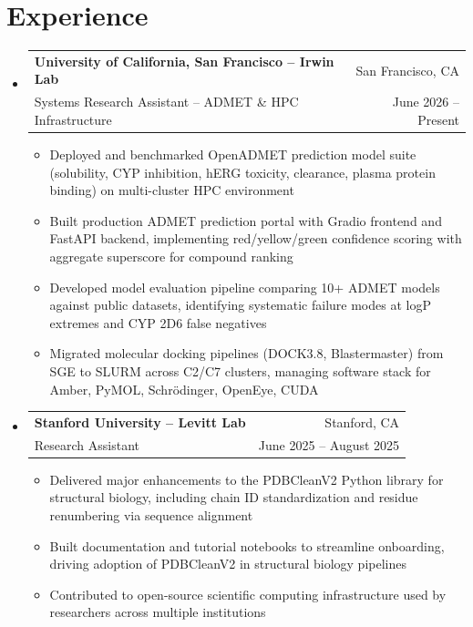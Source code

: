 \documentclass[letterpaper,11pt]{article}
\makeatletter
\newcommand{\resumeItem}[1]{
  \item\small{
    {#1 \vspace{-2pt}}
  }
}
\newcommand{\resumeSubheading}[4]{
  \vspace{-2pt}\item
    \begin{tabular*}{0.97\textwidth}[t]{l@{\extracolsep{\fill}}r}
      \textbf{#1} & #2 \\
      {\small#3} & {\small#4} \\
    \end{tabular*}\vspace{-7pt}
}
\newcommand{\resumeSubHeadingListStart}{\begin{itemize}[leftmargin=0.15in, label={}]}
\newcommand{\resumeSubHeadingListEnd}{\end{itemize}}
\newcommand{\resumeItemListStart}{\begin{itemize}}
\newcommand{\resumeItemListEnd}{\end{itemize}\vspace{-5pt}}
\makeatother
\begin{document}
\section{Experience}
  \resumeSubHeadingListStart

    \resumeSubheading
      {University of California, San Francisco -- Irwin Lab}{San Francisco, CA}
      {Systems Research Assistant -- ADMET \& HPC Infrastructure}{June 2026 -- Present}
      \resumeItemListStart
        \resumeItem{Deployed and benchmarked OpenADMET prediction model suite (solubility, CYP inhibition, hERG toxicity, clearance, plasma protein binding) on multi-cluster HPC environment}
        \resumeItem{Built production ADMET prediction portal with Gradio frontend and FastAPI backend, implementing red/yellow/green confidence scoring with aggregate superscore for compound ranking}
        \resumeItem{Developed model evaluation pipeline comparing 10+ ADMET models against public datasets, identifying systematic failure modes at logP extremes and CYP 2D6 false negatives}
        \resumeItem{Migrated molecular docking pipelines (DOCK3.8, Blastermaster) from SGE to SLURM across C2/C7 clusters, managing software stack for Amber, PyMOL, Schr\"odinger, OpenEye, CUDA}
      \resumeItemListEnd

    \resumeSubheading
      {Stanford University -- Levitt Lab}{Stanford, CA}
      {Research Assistant}{June 2025 -- August 2025}
      \resumeItemListStart
        \resumeItem{Delivered major enhancements to the PDBCleanV2 Python library for structural biology, including chain ID standardization and residue renumbering via sequence alignment}
        \resumeItem{Built documentation and tutorial notebooks to streamline onboarding, driving adoption of PDBCleanV2 in structural biology pipelines}
        \resumeItem{Contributed to open-source scientific computing infrastructure used by researchers across multiple institutions}
    \resumeItemListEnd

  \resumeSubHeadingListEnd


\end{document}
